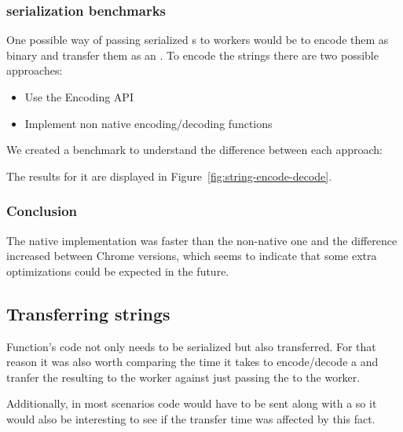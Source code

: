 
\subsubsection{\tstring{} serialization benchmarks}
One possible way of passing serialized \tfunction{}s to workers would be to encode them as binary and transfer them as an \tabuffer{}. To encode the strings there are two possible approaches:
\begin{itemize}
  \item Use the Encoding API\cite{encoding-api}
  \item Implement non native encoding/decoding functions
\end{itemize}

We created a benchmark to understand the difference between each approach:

The results for it are displayed in Figure~\ref{fig:string-encode-decode}.

\subsubsection{Conclusion}
The native implementation was faster than the non-native one and the difference increased between Chrome versions, which seems to indicate that some extra optimizations could be expected in the future.

\subsection{Transferring strings}
Function's code not only needs to be serialized but also transferred. For that reason it was also worth comparing the time it takes to encode/decode a \tstring{} and tranfer the resulting \tabuffer{} to the worker against just passing the \tstring{} to the worker.

Additionally, in most scenarios code would have to be sent along with a \ttarray{} so it would also be interesting to see if the transfer time was affected by this fact.

